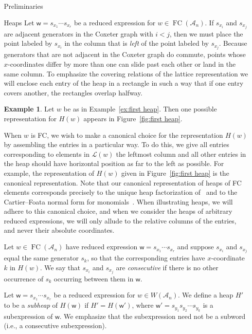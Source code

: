 \documentclass[11pt]{amsart}
\theoremstyle{definition}
\newtheorem{example}[theorem]{Example}
\numberwithin{equation}{section}
\newcommand{\A}{\mathcal{A}}
\renewcommand{\L}{\mathcal{L}}
\renewcommand{\(}{\left(}
\renewcommand{\)}{\right)}
\newcommand{\w}{\mathsf{w}}
\DeclareMathOperator{\FC}{FC}
\begin{document}
\begin{section}{Preliminaries}
\begin{subsection}{Heaps}
Let $\w=s_{x_1}\cdots s_{x_r}$ be a reduced expression for $w \in \FC(\A_{n})$.  If $s_{x_i}$ and $s_{x_j}$ are adjacent generators in the Coxeter graph with $i<j$, then we must place the point labeled by $s_{x_i}$ in the column that is \emph{left} of the point labeled by $s_{x_j}$.  Because generators that are not adjacent in the Coxeter graph do commute, points whose $x$-coordinates differ by more than one can slide past each other or land in the same column.  To emphasize the covering relations of the lattice representation we will enclose each entry of the heap in a rectangle in such a way that if one entry covers another, the rectangles overlap halfway.

\begin{example}\label{ex:second heap}
Let $w$ be as in Example~\ref{ex:first heap}.  Then one possible representation for $H(w)$ appears in Figure~\ref{fig:first heap}.
\end{example}

When $w$ is FC, we wish to make a canonical choice for the representation $H(w)$ by assembling the entries in a particular way.  To do this, we give all entries corresponding to elements in $\L(w)$ the leftmost column and all other entries in the heap should have horizontal position as far to the left as possible.  For example, the representation of $H(w)$ given in Figure~\ref{fig:first heap} is the canonical representation.  Note that our canonical representation of heaps of FC elements corresponds precisely to the unique heap factorization of~\cite[Lemma 2.9]{Viennot1986} and to the Cartier--Foata normal form for monomials~\cite{Cartier1969,Green2006a}.  When illustrating heaps, we will adhere to this canonical choice, and when we consider the heaps of arbitrary reduced expressions, we will only allude to the relative columns of the entries, and never their absolute coordinates.  

Let $w \in \FC(\A_n)$ have reduced expression $\w=s_{x_1}\cdots s_{x_r}$ and suppose $s_{x_i}$ and $s_{x_j}$ equal the same generator $s_k$, so that the corresponding entries have $x$-coordinate $k$ in $H(w)$.  We say that $s_{x_i}$ and $s_{x_j}$ are \emph{consecutive} if there is no other occurrence of $s_{k}$ occurring between them in $\w$.

Let $\w=s_{x_{1}} \cdots s_{x_{r}}$ be a reduced expression for $w \in W(\A_{n})$.  We define a heap $H'$ to be a \emph{subheap} of $H(\w)$ if $H'=H(\w')$, where $\w'=s_{y_1}s_{y_2} \cdots s_{y_k}$ is a subexpression of $\w$.  We emphasize that the subexpression need not be a subword (i.e., a consecutive subexpression).


\end{subsection}
\end{section}
\end{document}
